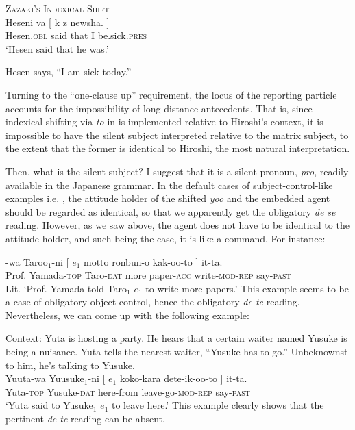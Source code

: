 \documentclass[output=paper]{langsci/langscibook}
\begin{document}
\ea\label{shimamu15} \textsc{Zazaki's Indexical Shift}  \citep[][79]{anand2006}\\ \gll Heseni va [ {k\textepsilon} {\textepsilon z} new\textepsilon sha. ]\\
Hesen.\textsc{obl} said {} that I be.sick.\textsc{pres} {} \\
\glt `Hesen said that he was.'\\
\begin{xlist}
\ex  Hesen says, ``I am sick today.''
\end{xlist}
\z

Turning to the ``one-clause up'' requirement, the locus of the reporting particle accounts for the impossibility of long-distance antecedents. That is, since indexical shifting via \textit{to} in  is implemented relative to Hiroshi's context, it is impossible to have the silent subject interpreted relative to the matrix subject, to the extent that the former is identical to Hiroshi, the most natural interpretation.

Then, what is the silent subject? I suggest that it is a silent pronoun, \textit{pro}, readily available in the Japanese grammar. In the default cases of subject-control-like examples i.e. , the attitude holder of the shifted \textit{yoo} and the embedded agent should be regarded as identical, so that we apparently get the obligatory \textit{de se} reading. However, as we saw above, the agent does not have to be identical to the attitude holder, and such being the case, it is like a command. For instance:

\ea\label{shimamu16} -wa Taroo$_1$-ni [ $e_{1}$ motto ronbun-o kak-oo-to ] it-ta.\\
{Prof. Yamada}-\textsc{top} Taro-\textsc{dat} {} {} more paper-\textsc{acc} write-\textsc{mod-rep} {} say-\textsc{past}\\
\glt Lit. `Prof. Yamada told Taro$_1$ $e_{1}$ to write more papers.'
\z
This example seems to be a case of obligatory object control, hence the obligatory \textit{de te} reading. Nevertheless, we can come up with the following example:

\largerpage[2]
\ea\label{shimamu17} Context: Yuta is hosting a party. He hears that a certain waiter named Yusuke is being a nuisance. Yuta tells the nearest waiter, ``Yusuke has to go.'' Unbeknownst to him, he's talking to Yusuke.\\
\gll Yuuta-wa Yuusuke$_1$-ni [ $e_1$ koko-kara dete-ik-oo-to ] it-ta.\\
Yuta-\textsc{top} Yusuke-\textsc{dat} {} {} here-from leave-go-\textsc{mod-rep} {} say-\textsc{past}\\
\glt `Yuta said to Yusuke$_1$ $e_1$ to leave here.'
\z
This example clearly shows that the pertinent \textit{de te} reading can be absent.
\end{document}
